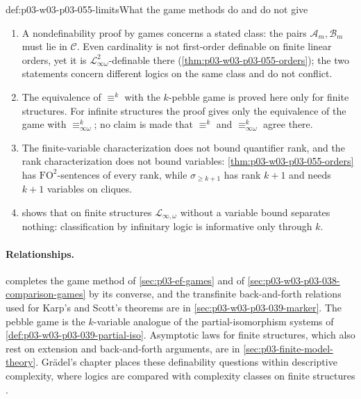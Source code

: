 \begin{hbwarning}{def:p03-w03-p03-055-limits}{What the game methods do and do not give}
\begin{enumerate}
\item A nondefinability proof by games concerns a stated class: the pairs
      \(\mathcal A_m,\mathcal B_m\) must lie in \(\mathcal C\). Even
      cardinality is not first-order definable on finite linear orders, yet
      it is \(\mathcal L^2_{\infty\omega}\)-definable there
      (\cref{thm:p03-w03-p03-055-orders}); the two statements concern
      different logics on the same class and do not conflict.
\item The equivalence of \(\equiv^k\) with the \(k\)-pebble game is proved
      here only for finite structures. For infinite structures the proof
      gives only the equivalence of the game with
      \(\equiv^k_{\infty\omega}\); no claim is made that \(\equiv^k\) and
      \(\equiv^k_{\infty\omega}\) agree there.
\item The finite-variable characterization does not bound quantifier rank,
      and the rank characterization does not bound variables:
      \cref{thm:p03-w03-p03-055-orders} has \(\mathrm{FO}^2\)-sentences of
      every rank, while \(\sigma_{\ge k+1}\) has rank \(k+1\) and needs
      \(k+1\) variables on cliques.
\item {} shows that on finite
      structures \(\mathcal L_{\infty,\omega}\) without a variable bound
      separates nothing: classification by infinitary logic is informative
      only through \(k\).
\end{enumerate}
\end{hbwarning}

\paragraph{Relationships.}
 completes the game method of
\cref{sec:p03-ef-games} and of \cref{sec:p03-w03-p03-038-comparison-games}
by its converse, and the transfinite back-and-forth relations used for
Karp's and Scott's theorems are in \cref{sec:p03-w03-p03-039-marker}. The pebble game is the
\(k\)-variable analogue of the partial-isomorphism systems of
\cref{def:p03-w03-p03-039-partial-iso}. Asymptotic laws for finite
structures, which also rest on extension and back-and-forth arguments, are
in \cref{sec:p03-finite-model-theory}. Gr\"adel's chapter places these
definability questions within descriptive complexity, where logics are
compared with complexity classes on finite structures
\cite[Section~3.1, pp.~125--138]{Gradel2007FMTDescriptiveChapter}.
